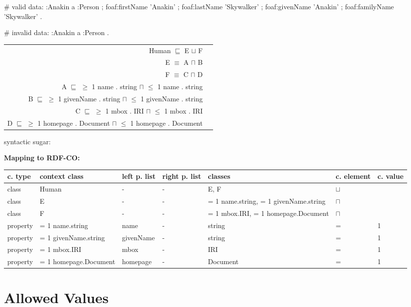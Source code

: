 \documentclass{llncs}
\newenvironment{gcotable}{
  \scriptsize
  \sffamily
  \vspace{0cm}
	\begin{center}
	\textbf{\vspace{0.4cm}Mapping to RDF-CO:} \\
  \begin{tabular}{l|l|l|l|l|l|l}
	\hline
  \textbf{c. type} & \textbf{context class} & \textbf{left p. list} & \textbf{right p. list} & \textbf{classes} & \textbf{c. element} & \textbf{c. value} \\
  \hline

}{
  \hline
  \end{tabular}
	\end{center}
}
\newenvironment{DL}{
  \vspace{0cm}
	\begin{center}
  \begin{tabular}{r l}

}{
  \end{tabular}
	\end{center}
}
\begin{document}
\begin{ex}
# valid data:
:Anakin
    a :Person ;
    foaf:firstName 'Anakin' ;
    foaf:lastName 'Skywalker' ;
    foaf:givenName 'Anakin' ;
    foaf:familyName 'Skywalker' .
\end{ex}

\begin{ex}
# invalid data:
:Anakin
    a :Person .
\end{ex}

\begin{DL}
Human $\sqsubseteq$ E $\sqcup$ F \\ 
E $\equiv$ A $\sqcap$ B \\
F $\equiv$ C $\sqcap$ D \\
A $\sqsubseteq$ $\geq$ 1 name . string $\sqcap$ $\leq$ 1 name . string \\
B $\sqsubseteq$ $\geq$ 1 givenName . string $\sqcap$ $\leq$ 1 givenName . string \\
C $\sqsubseteq$ $\geq$ 1 mbox . IRI $\sqcap$ $\leq$ 1 mbox . IRI \\
D $\sqsubseteq$ $\geq$ 1 homepage . Document $\sqcap$ $\leq$ 1 homepage . Document \\
\end{DL}

syntactic sugar:

\begin{gcotable}
class & Human & - & - & E, F & $\sqcup$ \\
class & E & - & - & = 1 name.string, = 1 givenName.string & $\sqcap$ \\
class & F & - & - & = 1 mbox.IRI, = 1 homepage.Document & $\sqcap$ \\
property & = 1 name.string & name & - & string & = & 1 \\
property & = 1 givenName.string & givenName & - & string & = & 1 \\
property & = 1 mbox.IRI & mbox & - & IRI & = & 1 \\
property & = 1 homepage.Document & homepage & - & Document & = & 1 \\
\end{gcotable}

\section{Allowed Values}
\end{document}

